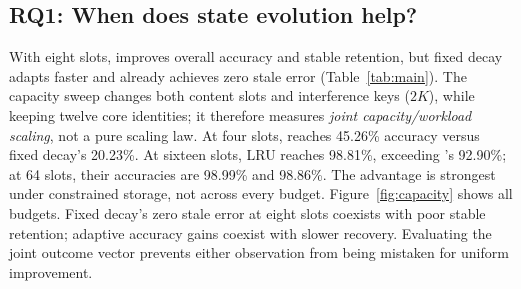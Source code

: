 \subsection{RQ1: When does state evolution help?}

With eight slots, \ame improves overall accuracy and stable retention, but fixed decay adapts faster and already achieves zero stale error (Table~\ref{tab:main}). The capacity sweep changes both content slots and interference keys ($2K$), while keeping twelve core identities; it therefore measures \emph{joint capacity/workload scaling}, not a pure scaling law. At four slots, \ame reaches 45.26\% accuracy versus fixed decay's 20.23\%. At sixteen slots, LRU reaches 98.81\%, exceeding \ame's 92.90\%; at 64 slots, their accuracies are 98.99\% and 98.86\%. The advantage is strongest under constrained storage, not across every budget.
Figure~\ref{fig:capacity} shows all budgets. Fixed decay's zero stale error at eight slots coexists with poor stable retention; adaptive accuracy gains coexist with slower recovery. Evaluating the joint outcome vector prevents either observation from being mistaken for uniform improvement.
